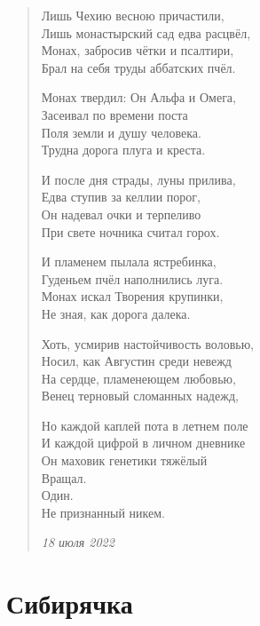\begin{verse}
Лишь Чехию весною причастили,\\
Лишь монастырский сад едва расцвёл,\\
Монах, забросив чётки и псалтири,\\
Брал на себя труды аббатских пчёл.

Монах твердил: Он Альфа и Омега,\\
Засеивал по времени поста\\
Поля земли и душу человека.\\
Трудна дорога плуга и креста.

И после дня страды, луны прилива,\\
Едва ступив за келлии порог,\\
Он надевал очки и терпеливо\\
При свете ночника считал горох.

И пламенем пылала ястребинка,\\
Гуденьем пчёл наполнились луга.\\
Монах искал Творения крупинки,\\
Не зная, как дорога далека.

Хоть, усмирив настойчивость воловью,\\
Носил, как Августин среди невежд\\
На сердце, пламенеющем любовью,\\
Венец терновый сломанных надежд,

Но каждой каплей пота в летнем поле\\
И каждой цифрой в личном дневнике\\
Он маховик генетики тяжёлый\\
Вращал.\\
Один.\\
Не признанный никем.

\emph{18 июля 2022}

\end{verse}

\newpage
\section{Сибирячка}

